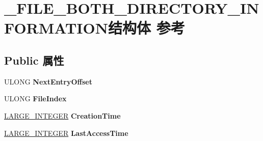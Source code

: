 \hypertarget{struct___f_i_l_e___b_o_t_h___d_i_r_e_c_t_o_r_y___i_n_f_o_r_m_a_t_i_o_n}{}\section{\+\_\+\+F\+I\+L\+E\+\_\+\+B\+O\+T\+H\+\_\+\+D\+I\+R\+E\+C\+T\+O\+R\+Y\+\_\+\+I\+N\+F\+O\+R\+M\+A\+T\+I\+O\+N结构体 参考}
\label{struct___f_i_l_e___b_o_t_h___d_i_r_e_c_t_o_r_y___i_n_f_o_r_m_a_t_i_o_n}
\subsection*{Public 属性}
\begin{DoxyCompactItemize}
\item 
\mbox{\label{struct___f_i_l_e___b_o_t_h___d_i_r_e_c_t_o_r_y___i_n_f_o_r_m_a_t_i_o_n_a2049ff4d914e28fa29fe868c25752125}} 
U\+L\+O\+NG {\bfseries Next\+Entry\+Offset}
\item 
\mbox{\label{struct___f_i_l_e___b_o_t_h___d_i_r_e_c_t_o_r_y___i_n_f_o_r_m_a_t_i_o_n_a867cf46e186d8562e1998b8965057632}} 
U\+L\+O\+NG {\bfseries File\+Index}
\item 
\mbox{\label{struct___f_i_l_e___b_o_t_h___d_i_r_e_c_t_o_r_y___i_n_f_o_r_m_a_t_i_o_n_afb24db5b45cda08bcbf1f15843acaa45}} 
\hyperlink{union___l_a_r_g_e___i_n_t_e_g_e_r}{L\+A\+R\+G\+E\+\_\+\+I\+N\+T\+E\+G\+ER} {\bfseries Creation\+Time}
\item 
\mbox{\label{struct___f_i_l_e___b_o_t_h___d_i_r_e_c_t_o_r_y___i_n_f_o_r_m_a_t_i_o_n_ac6f0d9fd5b331953b12355778207dbf3}} 
\hyperlink{union___l_a_r_g_e___i_n_t_e_g_e_r}{L\+A\+R\+G\+E\+\_\+\+I\+N\+T\+E\+G\+ER} {\bfseries Last\+Access\+Time}
\item 
\mbox{\label{struct___f_i_l_e___b_o_t_h___d_i_r_e_c_t_o_r_y___i_n_f_o_r_m_a_t_i_o_n_a1adfa2a4ba1c75ea57f945584e249364}} 

\end{DoxyCompactItemize}
